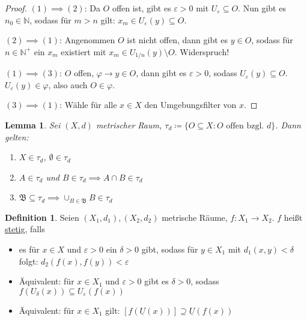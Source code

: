 \documentclass[12pt]{scrartcl}%
\newtheorem{lemma}{Lemma}
\theoremstyle{definition}
\newtheorem*{defn}{Definition}
\theoremstyle{remark}
\begin{document}
\begin{proof}
    $(1)\implies (2)$: Da $O$ offen ist, gibt es $\varepsilon > 0$ mit $U_\varepsilon \subseteq O$. Nun gibt es $n_0\in\mathbb{N}$, sodass für $m > n$ gilt: $x_m \in U_\varepsilon(y)\subseteq O$.

    $(2) \implies (1)$: Angenommen $O$ ist nicht offen, dann gibt es $y\in O$, sodass für $n\in \mathbb{N}^+$ ein $x_m$ existiert mit $x_m\in U_{1/n}(y)\setminus O$. Widerspruch!

    $(1) \implies (3)$: $O$ offen, $\varphi \to y\in O$, dann gibt es $\varepsilon > 0$, sodass $U_\varepsilon(y) \subseteq O$. $U_\varepsilon(y)\in\varphi$, also auch $O\in\varphi$.

    $(3) \implies (1)$: Wähle für alle $x\in X$ den Umgebungsfilter von $x$.
\end{proof}

\begin{lemma}
    Sei $(X, d)$ metrischer Raum, $\tau_d\coloneqq \{O\subseteq X: O \text{ offen bzgl. } d\}$. Dann gelten:

    \begin{enumerate}[label=(\arabic*)]
        \item $X\in \tau_d$, $\emptyset\in \tau_d$
        \item $A\in \tau_d$ und $B\in \tau_d \implies A\cap B\in \tau_d$
        \item $\mathfrak{B} \subseteq \tau_d \implies \cup_{B\in\mathfrak{B}} B \in \tau_d$
    \end{enumerate}
\end{lemma}

\begin{defn}
    Seien $(X_1, d_1), (X_2, d_2)$ metrische Räume, $f: X_1\to X_2$. $f$ heißt \underline{stetig}, falls 
    
    \begin{itemize}
        \item es für $x\in X$ und $\varepsilon > 0$ ein $\delta > 0$ gibt, sodass für $y\in X_1$ mit $d_1(x,y) < \delta$ folgt: $d_2(f(x),f(y)) < \varepsilon$

        \item Äquivalent: für $x\in X_1$ und $\varepsilon > 0$ gibt es $\delta > 0$, sodass $f(U_\delta(x)) \subseteq U_\varepsilon(f(x))$

        \item Äquivalent: für $x\in X_1$ gilt: $[f(\underline{U}(x))] \supseteq \underline{U}(f(x))$
    \end{itemize}
\end{defn}
\end{document}
